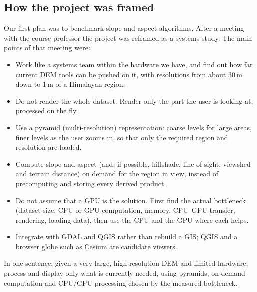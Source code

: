 \documentclass[11pt,a4paper]{article}
\begin{document}
\subsection{How the project was framed}
Our first plan was to benchmark slope and aspect algorithms. After a meeting with the course professor the project
was reframed as a systems study. The main points of that meeting were:
\begin{itemize}
  \item Work like a systems team within the hardware we have, and find out how far current DEM tools can be pushed on
  it, with resolutions from about 30\,m down to 1\,m of a Himalayan region.
  \item Do not render the whole dataset. Render only the part the user is looking at, processed on the fly.
  \item Use a pyramid (multi-resolution) representation: coarse levels for large areas, finer levels as the user
  zooms in, so that only the required region and resolution are loaded.
  \item Compute slope and aspect (and, if possible, hillshade, line of sight, viewshed and terrain distance) on demand
  for the region in view, instead of precomputing and storing every derived product.
  \item Do not assume that a GPU is the solution. First find the actual bottleneck (dataset size, CPU or GPU
  computation, memory, CPU--GPU transfer, rendering, loading data), then use the CPU and the GPU where each helps.
  \item Integrate with GDAL and QGIS rather than rebuild a GIS; QGIS and a browser globe such as Cesium are candidate
  viewers.
\end{itemize}
In one sentence: given a very large, high-resolution DEM and limited hardware, process and display only what is
currently needed, using pyramids, on-demand computation and CPU/GPU processing chosen by the measured bottleneck.
\end{document}
